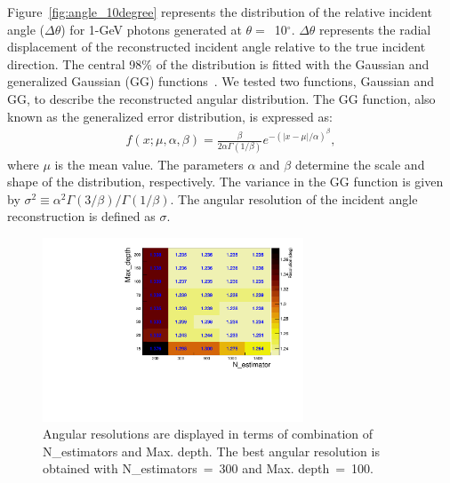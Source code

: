 \documentclass[preprint,12pt,times,a4paper]{elsarticle}
\begin{document}
Figure~\ref{fig:angle_10degree} represents the distribution of the relative incident angle ($\Delta\theta$) for 1-GeV photons generated at $\theta=$~10$^{\circ}$. $\Delta\theta$ represents the radial displacement of the reconstructed incident angle relative to the true incident direction. The central 98\% of the distribution is fitted with the Gaussian and generalized Gaussian (GG) functions~\cite{GGfun}. We tested two functions, Gaussian and GG, to describe the reconstructed angular distribution. The GG function, also known as the generalized error distribution, is expressed as:
\begin{eqnarray} 
f(x; \mu, \alpha, \beta) = \frac{\beta}{2 \alpha \Gamma(1/\beta)}e^{-(|x-\mu|/\alpha)^\beta},
\label{eqn:gg}
\end{eqnarray}
where $\mu$ is the mean value. The parameters $\alpha$ and $\beta$ determine the scale and shape of the distribution, respectively. The variance in the GG function is given by $\sigma^2 \equiv \alpha^2 \Gamma(3/\beta) / \Gamma(1/\beta)$. The angular resolution of the incident angle reconstruction is defined as $\sigma$.

\begin{figure}[!hbt]
\centering
\includegraphics[width=0.69\textwidth]{figures/Fig4_Opt.pdf}
\caption{Angular resolutions are displayed in terms of combination of N\_estimators and Max. depth. The best angular resolution is obtained with N\_estimators~=~300 and Max. depth~=~100. }
\label{fig:par_scan}
\end{figure}
\end{document}
